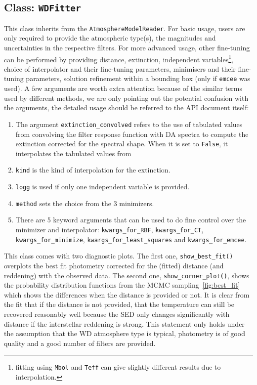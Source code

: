 \documentclass[fleqn,usenatbib]{rasti}
\begin{document}
\subsection{Class: \texttt{WDFitter}}
\label{sec:wdfitter}
This class inherits from the \verb+AtmosphereModelReader+. For basic usage,
users are only required to provide the atmospheric type(s), the magnitudes and
uncertainties in the respective filters. For more advanced usage, other
fine-tuning can be performed by providing distance, extinction, independent
variables\footnote{fitting using \texttt{Mbol} and \texttt{Teff} can give slightly
different results due to interpolation.}, choice of interpolator and their
fine-tuning parameters, minimisers and their fine-tuning parameters,
solution refinement within a bounding box (only if \verb+emcee+ was used).
A few arguments are worth extra attention because of the similar terms used
by different methods, we are only pointing out the potential confusion with
the arguments, the detailed usage should be referred to the API document
itself:
\begin{enumerate}
    \item The argument \verb+extinction_convolved+ refers to the use of
    tabulated values from convolving the filter response function with DA
    spectra to compute the extinction corrected for the spectral shape.
    When it is set to \verb+False+, it interpolates the tabulated values
    from \citet{2011ApJ...737..103S}
    \item \verb+kind+ is the kind of interpolation for the extinction.
    \item \verb+logg+ is used if only one independent variable is
    provided.
    \item \verb+method+ sets the choice from the 3 minimizers.
    \item There are 5 keyword arguments that can be used to do fine 
    control over the minimizer and interpolator: \verb+kwargs_for_RBF+,
    \verb+kwargs_for_CT+, \verb+kwargs_for_minimize+,
    \verb+kwargs_for_least_squares+ and \verb+kwargs_for_emcee+.
\end{enumerate}

This class comes with two diagnostic plots. The first one,
\verb+show_best_fit()+ overplots the best fit photometry corrected for the
(fitted) distance (and reddening) with the observed
data. The second one, \verb+show_corner_plot()+,
shows the probability distribution functions from the MCMC
sampling~\ref{fig:best_fit} which shows the differences when the distance
is provided or not. It is clear from the fit that if the distance is not
provided, that the temperature can still be recovered reasonably well because
the SED only changes significantly with distance if the interstellar
reddening is strong. This statement only holds under the assumption that
the WD atmosphere type is typical, photometry is of good quality and a
good number of filters are provided.
\end{document}
